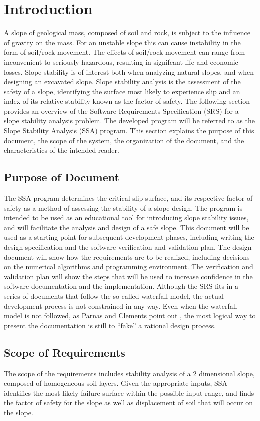 \documentclass[12pt]{article}
\begin{document}
\section{Introduction}
\label{Sec:Intro}
A slope of geological mass, composed of soil and rock, is subject to the influence of gravity on the mass. For an unstable slope this can cause instability in the form of soil/rock movement. The effects of soil/rock movement can range from inconvenient to seriously hazardous, resulting in signifcant life and economic losses. Slope stability is of interest both when analyzing natural slopes, and when designing an excavated slope. Slope stability analysis is the assessment of the safety of a slope, identifying the surface most likely to experience slip and an index of its relative stability known as the factor of safety.
The following section provides an overview of the Software Requirements Specification (SRS) for a slope stability analysis problem. The developed program will be referred to as the Slope Stability Analysis (SSA) program. This section explains the purpose of this document, the scope of the system, the organization of the document, and the characteristics of the intended reader.
\subsection{Purpose of Document}
\label{Sec:DocPurpose}
The SSA program determines the critical slip surface, and its respective factor of safety as a method of assessing the stability of a slope design. The program is intended to be used as an educational tool for introducing slope stability issues, and will facilitate the analysis and design of a safe slope.
This document will be used as a starting point for subsequent development phases, including writing the design specification and the software verification and validation plan. The design document will show how the requirements are to be realized, including decisions on the numerical algorithms and programming environment. The verification and validation plan will show the steps that will be used to increase confidence in the software documentation and the implementation. Although the SRS fits in a series of documents that follow the so-called waterfall model, the actual development process is not constrained in any way. Even when the waterfall model is not followed, as Parnas and Clements point out \cite{parnasClements1986}, the most logical way to present the documentation is still to ``fake'' a rational design process.
\subsection{Scope of Requirements}
\label{Sec:ReqsScope}
The scope of the requirements includes stability analysis of a 2 dimensional slope, composed of homogeneous soil layers. Given the appropriate inputs, SSA identifies the most likely failure surface within the possible input range, and finds the factor of safety for the slope as well as displacement of soil that will occur on the slope.
\end{document}
